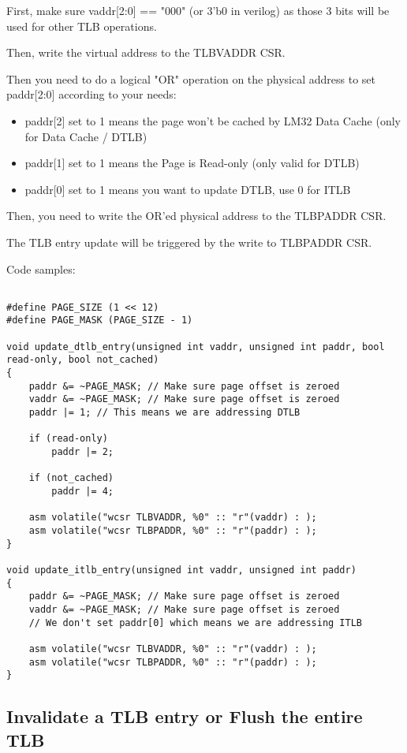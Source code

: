 \documentclass[a4paper,11pt]{article}
\begin{document}
First, make sure vaddr[2:0] == "000" (or 3'b0 in verilog) as those 3 bits will be used for other TLB operations.

Then, write the virtual address to the TLBVADDR CSR.

Then you need to do a logical "OR" operation on the physical address to set paddr[2:0] according to your needs:

\begin{itemize}
	\item paddr[2] set to 1 means the page won't be cached by LM32 Data Cache (only for Data Cache / DTLB)
	\item paddr[1] set to 1 means the Page is Read-only (only valid for DTLB)
	\item paddr[0] set to 1 means you want to update DTLB, use 0 for ITLB
\end{itemize}

Then, you need to write the OR'ed physical address to the TLBPADDR CSR.

The TLB entry update will be triggered by the write to TLBPADDR CSR.

Code samples:

\begin{lstlisting}

#define PAGE_SIZE (1 << 12)
#define PAGE_MASK (PAGE_SIZE - 1)

void update_dtlb_entry(unsigned int vaddr, unsigned int paddr, bool read-only, bool not_cached)
{
	paddr &= ~PAGE_MASK; // Make sure page offset is zeroed
	vaddr &= ~PAGE_MASK; // Make sure page offset is zeroed
	paddr |= 1; // This means we are addressing DTLB

	if (read-only)
		paddr |= 2;

	if (not_cached)
		paddr |= 4;

	asm volatile("wcsr TLBVADDR, %0" :: "r"(vaddr) : );
	asm volatile("wcsr TLBPADDR, %0" :: "r"(paddr) : );
}

void update_itlb_entry(unsigned int vaddr, unsigned int paddr)
{
	paddr &= ~PAGE_MASK; // Make sure page offset is zeroed
	vaddr &= ~PAGE_MASK; // Make sure page offset is zeroed
	// We don't set paddr[0] which means we are addressing ITLB

	asm volatile("wcsr TLBVADDR, %0" :: "r"(vaddr) : );
	asm volatile("wcsr TLBPADDR, %0" :: "r"(paddr) : );
}
\end{lstlisting}

\subsection{Invalidate a TLB entry or Flush the entire TLB}
\end{document}
